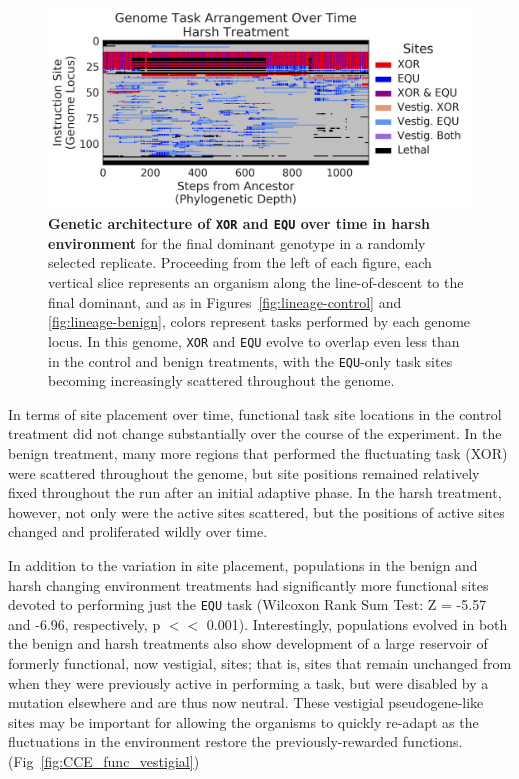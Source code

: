 \documentclass[10pt,letterpaper,final]{article}
\begin{document}
	\begin{figure}[!h]
	\includegraphics[width=0.95\columnwidth]{figures/CE/harsh__whole_taskmap.png}
	\caption{\textbf{Genetic architecture of \texttt{XOR} and \texttt{EQU} over time in harsh environment} for the final dominant genotype in a randomly selected replicate. Proceeding from the left of each figure, each vertical slice represents an organism along the line-of-descent to the final dominant, and as in Figures~\ref{fig:lineage-control} and \ref{fig:lineage-benign}, colors represent tasks performed by each genome locus. In this genome, \texttt{XOR} and \texttt{EQU} evolve to overlap even less than in the control and benign treatments, with the \texttt{EQU}-only task sites becoming increasingly scattered throughout the genome.}
	\label{fig:lineage-harsh}
	\end{figure}

In terms of site placement over time, functional task site locations in the control treatment did not change substantially over the course of the experiment. In the benign treatment, many more regions that performed the fluctuating task (XOR) were scattered throughout the genome, but site positions remained relatively fixed throughout the run after an initial adaptive phase. In the harsh treatment, however, not only were the active sites scattered, but the positions of active sites changed and proliferated wildly over time.

In addition to the variation in site placement, populations in the benign and harsh changing environment treatments had significantly more functional sites devoted to performing just the \texttt{EQU} task (Wilcoxon Rank Sum Test: Z = -5.57 and -6.96, respectively, p $<<$ 0.001).
Interestingly, populations evolved in both the benign and harsh treatments also show development of a large reservoir of formerly functional, now vestigial, sites; that is, sites that remain unchanged from when they were previously active in performing a task, but were disabled by a mutation elsewhere and are thus now neutral. These vestigial pseudogene-like sites may be important for allowing the organisms to quickly re-adapt as the fluctuations in the environment restore the previously-rewarded functions. (Fig~\ref{fig:CCE_func_vestigial})
\end{document}
